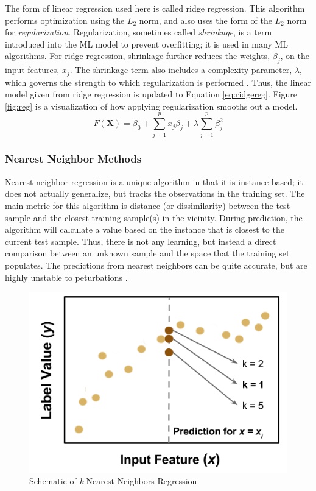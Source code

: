 The form of linear regression used here is called ridge regression. This
algorithm performs optimization using the $L_2$ norm, and also uses the form of
the $L_2$ norm for \textit{regularization}. Regularization, sometimes called
\textit{shrinkage}, is a term introduced into the \gls{ML} model to prevent
overfitting; it is used in many \gls{ML} algorithms. For ridge
regression, shrinkage further reduces the weights, $\beta_j$, on the input
features, $x_j$. The shrinkage term also includes a complexity parameter,
$\lambda$, which governs the strength to which regularization is performed
\cite{elements_stats}. Thus, the linear model given from ridge regression
is updated to Equation \ref{eq:ridgereg}.  Figure \ref{fig:reg} is a
visualization of how applying regularization smooths out a model.
\begin{equation}
  F(\boldsymbol{X}) = \beta_{0} +  \sum_{j=1}^{p} x_{j} \beta_{j} + \lambda \sum_{j=1}^{p} \beta_{j}^2
  \label{eq:ridgereg}
\end{equation}

\subsubsection{Nearest Neighbor Methods}
\label{sec:neighbor}

Nearest neighbor regression is a unique algorithm in that it is instance-based;
it does not actually generalize, but tracks the observations in the training
set.  The main metric for this algorithm is distance (or dissimilarity) between
the test sample and the closest training sample(s) in the vicinity.  During
prediction, the algorithm will calculate a value based on the instance that is
closest to the current test sample. Thus, there is not any learning, but
instead a direct comparison between an unknown sample and the space that the
training set populates. The predictions from nearest neighbors can be quite
accurate, but are highly unstable to peturbations \cite{elements_stats}.

\begin{figure}[!htb]
  \centering
  \includegraphics[width=0.8\linewidth]{./chapters/litrev/nn-fig.png}
  \caption{Schematic of \textit{k}-Nearest Neighbors Regression}
  \label{fig:nn}
\end{figure}

